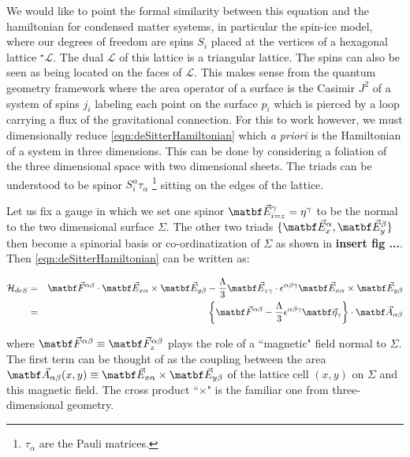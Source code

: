 \begin{doublespace}
We would like to point the formal similarity between this equation and the hamiltonian for condensed matter systems, in particular the spin-ice model, where our degrees of freedom are spins $S_{i}$ placed at the vertices of a hexagonal lattice ${}^{\star}\mathcal{L}$. The dual $\mathcal{L}$ of this lattice is a triangular lattice. The spins can also be seen as being located on the faces of $\mathcal{L}$. This makes sense from the quantum geometry framework where the area operator of a surface is the Casimir $J^{2}$ of a system of spins $j_{i}$ labeling each point on the surface $p_{i}$ which is pierced by a loop carrying a flux of the gravitational connection. For this to work however, we must dimensionally reduce \ref{eqn:deSitterHamiltonian} which \emph{a priori} is the Hamiltonian of a system in three dimensions. This can be done by considering a foliation of the three dimensional space with two dimensional sheets. The triads can be understood to be spinor $ S^\alpha_i \tau_\alpha $ \footnote{$  \tau_\alpha $ are the Pauli matrices.} sitting on the edges of the lattice.

Let us fix a gauge in which we set one spinor $\vectb{E}^\gamma_{i=z} = \eta^{\gamma}$ to be the normal to the two dimensional surface $ \Sigma $. The other two triads $ \{ \vectb{E}^\alpha_x , \vectb{E}^\beta_y \} $ then become a spinorial basis or co-ordinatization of $ \Sigma $ as shown in \textbf{insert fig ...}. Then \ref{eqn:deSitterHamiltonian} can be written as:

\begin{eqnarray}
	\mathcal{H}_{deS} & = & \vectb{F}^{\alpha \beta} \cdot \vectb{E}_{x\alpha} \times\vectb{E}_{y\beta} - \frac{\Lambda}{3}  \vectb{E}_{z\gamma} \cdot \epsilon^{ \alpha \beta \gamma } \vectb{E}_{x\alpha} \times \vectb{E}_{y\beta} \nonumber \\
	& = & \left\lbrace \vectb{F}^{\alpha \beta} - \frac{\Lambda}{3} \epsilon^{\alpha \beta \gamma} \vectb{\eta}_\gamma \right\rbrace \cdot \vectb{A}_{\alpha \beta}
\end{eqnarray} 

where $ \vectb{F}^{\alpha \beta} \equiv \vectb{F}^{\alpha \beta}_z $ plays the role of a ``magnetic" field normal to $ \Sigma $. The first term can be thought of as the coupling between the area $ \vectb{A}_{\alpha \beta}(x,y) \equiv \vectb{E}_{x\alpha} \times \vectb{E}_{y\beta} $ of the lattice cell $ (x,y) $ on $ \Sigma $ and this magnetic field. The cross product ``$ \times $" is the familiar one from three-dimensional geometry.


\end{doublespace}
